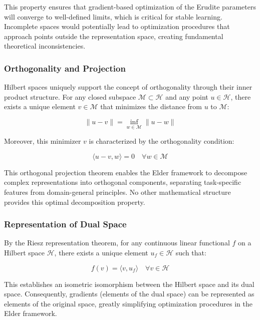 This property ensures that gradient-based optimization of the Erudite parameters will converge to well-defined limits, which is critical for stable learning. Incomplete spaces would potentially lead to optimization procedures that approach points outside the representation space, creating fundamental theoretical inconsistencies.

\subsubsection{Orthogonality and Projection}

Hilbert spaces uniquely support the concept of orthogonality through their inner product structure. For any closed subspace $\mathcal{M} \subset \mathcal{H}$ and any point $u \in \mathcal{H}$, there exists a unique element $v \in \mathcal{M}$ that minimizes the distance from $u$ to $\mathcal{M}$:

\begin{equation}
\|u - v\| = \inf_{w \in \mathcal{M}} \|u - w\|
\end{equation}

Moreover, this minimizer $v$ is characterized by the orthogonality condition:

\begin{equation}
\langle u - v, w \rangle = 0 \quad \forall w \in \mathcal{M}
\end{equation}

This orthogonal projection theorem enables the Elder framework to decompose complex representations into orthogonal components, separating task-specific features from domain-general principles. No other mathematical structure provides this optimal decomposition property.

\subsubsection{Representation of Dual Space}

By the Riesz representation theorem, for any continuous linear functional $f$ on a Hilbert space $\mathcal{H}$, there exists a unique element $u_f \in \mathcal{H}$ such that:

\begin{equation}
f(v) = \langle v, u_f \rangle \quad \forall v \in \mathcal{H}
\end{equation}

This establishes an isometric isomorphism between the Hilbert space and its dual space. Consequently, gradients (elements of the dual space) can be represented as elements of the original space, greatly simplifying optimization procedures in the Elder framework.

